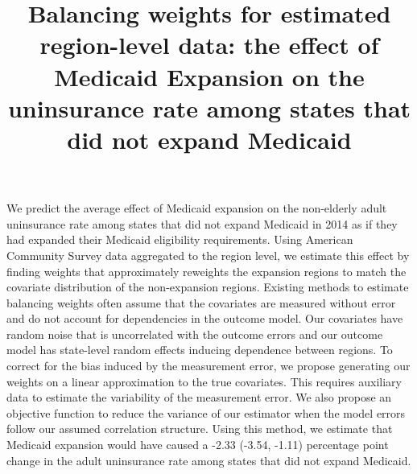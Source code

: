 \documentclass[aoas]{imsart}
\theoremstyle{plain}
\theoremstyle{remark}
\begin{document}
\begin{frontmatter}

\title{Balancing weights for estimated region-level data: the effect of Medicaid Expansion on the uninsurance rate among states that did not expand Medicaid}



\begin{flushleft}
We predict the average effect of Medicaid expansion on the non-elderly adult uninsurance rate among states that did not expand Medicaid in 2014 as if they had expanded their Medicaid eligibility requirements. Using American Community Survey data aggregated to the region level, we estimate this effect by finding weights that approximately reweights the expansion regions to match the covariate distribution of the non-expansion regions. Existing methods to estimate balancing weights often assume that the covariates are measured without error and do not account for dependencies in the outcome model. Our covariates have random noise that is uncorrelated with the outcome errors and our outcome model has state-level random effects inducing dependence between regions. To correct for the bias induced by the measurement error, we propose generating our weights on a linear approximation to the true covariates. This requires auxiliary data to estimate the variability of the measurement error. We also propose an objective function to reduce the variance of our estimator when the model errors follow our assumed correlation structure. Using this method, we estimate that Medicaid expansion would have caused a -2.33 (-3.54, -1.11) percentage point change in the adult uninsurance rate among states that did not expand Medicaid.
\end{flushleft}


\begin{keyword}
\end{keyword}

\end{frontmatter}
\end{document}
